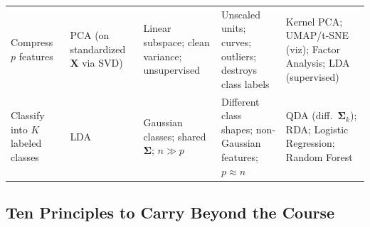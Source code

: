 \documentclass[11pt, a4paper]{article}
\begin{document}
\begin{table}[h!]
\begin{tabularx}{\textwidth}{>{\raggedright\arraybackslash}p{2.7cm} >{\raggedright\arraybackslash}p{2.7cm} >{\raggedright\arraybackslash}p{3.0cm} >{\raggedright\arraybackslash}p{3.1cm} >{\raggedright\arraybackslash}X}
Compress $p$ features & PCA (on standardized $\mathbf{X}$ via SVD) & Linear subspace; clean variance; unsupervised & Unscaled units; curves; outliers; destroys class labels & Kernel PCA; UMAP/t-SNE (viz); Factor Analysis; LDA (supervised) \\
Classify into $K$ labeled classes & LDA & Gaussian classes; shared $\boldsymbol{\Sigma}$; $n \gg p$ & Different class shapes; non-Gaussian features; $p \approx n$ & QDA (diff.\ $\boldsymbol{\Sigma}_k$); RDA; Logistic Regression; Random Forest \\
\bottomrule
\end{tabularx}
\end{table}

\subsection{Ten Principles to Carry Beyond the Course}
\end{document}
